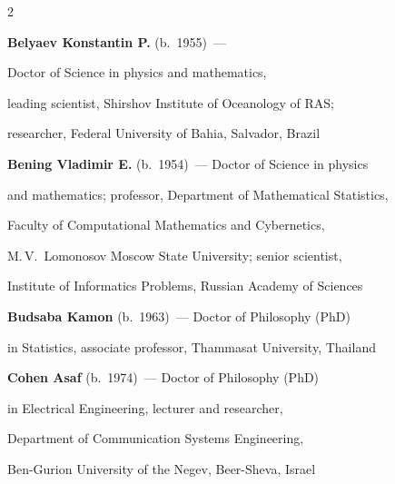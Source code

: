 \begin{multicols}{2}








\noindent

\textbf{Belyaev Konstantin P.} (b.\ 1955)~--- 

Doctor of Science in physics and mathematics, 

leading scientist, Shirshov Institute of Oceanology of RAS; 

researcher, Federal University of Bahia, Salvador, Brazil



\vspace*{4pt}



\noindent

\textbf{Bening Vladimir E.} (b.\ 1954)~--- Doctor of Science in physics 

and mathematics; professor, Department of Mathematical Statistics, 

Faculty of Computational Mathematics and Cybernetics, 

M.\,V.~Lomonosov Moscow State University; senior scientist, 

Institute of Informatics Problems, Russian Academy of Sciences



\vspace*{4pt}



\noindent

\textbf{Budsaba Kamon} (b.\ 1963)~--- Doctor of Philosophy (PhD)

in Statistics, associate professor, Thammasat University, Thailand



\vspace*{4pt}



\noindent

\textbf{Cohen Asaf} (b.\ 1974)~--- Doctor of Philosophy (PhD) 

in Electrical Engineering, lecturer and researcher,

Department of Communication Systems Engineering,

Ben-Gurion University of the Negev, Beer-Sheva, Israel








\end{multicols}

